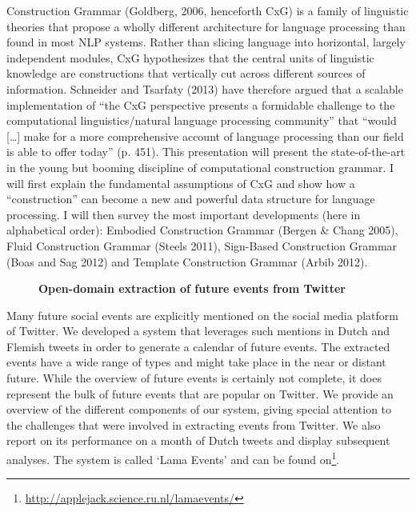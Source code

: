 \documentclass[10pt, a4paper, twopage, headinclude, footinclude, BCOR5mm]{scrartcl}
\begin{document}
\noindent
Construction Grammar (Goldberg, 2006, henceforth CxG) is a family of linguistic theories that propose a wholly different architecture for language processing than found in most NLP systems. Rather than slicing language into horizontal, largely independent modules, CxG hypothesizes that the central units of linguistic knowledge are constructions that vertically cut across different sources of information. Schneider and Tsarfaty (2013) have therefore argued that a scalable implementation of “the CxG perspective presents a formidable challenge to the computational linguistics/natural language processing community” that “would […] make for a more comprehensive account of language processing than our field is able to offer today” (p. 451). This presentation will present the state-of-the-art in the young but booming discipline of computational construction grammar. I will first explain the fundamental assumptions of CxG and show how a “construction” can become a new and powerful data structure for language processing. I will then survey the most important developments (here in alphabetical order): Embodied Construction Grammar (Bergen \& Chang 2005), Fluid Construction Grammar (Steels 2011), Sign-Based Construction Grammar (Boas and Sag 2012) and Template Construction Grammar (Arbib 2012).


\newpage

\begin{figure}[t!]
\centering
\large\textbf{Open-domain extraction of future events from Twitter}
\vspace*{0.5cm}
\end{figure}


        \begin{table}[t!]
    \end{table}

\noindent
Many future social events are explicitly mentioned on the social media platform of Twitter. We developed a system that leverages such mentions in Dutch and Flemish tweets in order to generate a calendar of future events. The extracted events have a wide range of types and might take place in the near or distant future. While the overview of future events is certainly not complete, it does represent the bulk of future events that are popular on Twitter.   We provide an overview of the different components of our system, giving special attention to the challenges that were involved in extracting events from Twitter. We also report on its performance on a month of Dutch tweets and display subsequent analyses. The system is called `Lama Events' and can be found on\footnote{\url{ http://applejack.science.ru.nl/lamaevents/}}. 
\end{document}
